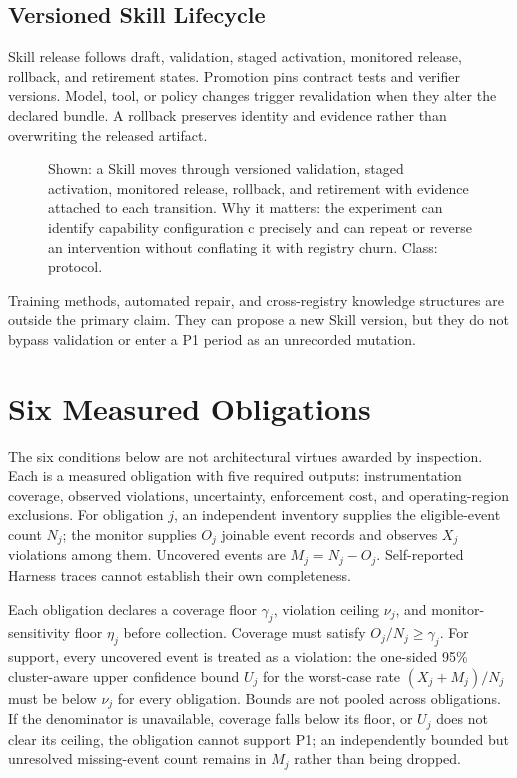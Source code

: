 \subsection{Versioned Skill Lifecycle}

Skill release follows draft, validation, staged activation, monitored release, rollback, and retirement states. Promotion pins contract tests and verifier versions. Model, tool, or policy changes trigger revalidation when they alter the declared bundle. A rollback preserves identity and evidence rather than overwriting the released artifact.

\begin{figure}[t]
\centering
\caption{Shown: a Skill moves through versioned validation, staged activation, monitored release, rollback, and retirement with evidence attached to each transition. Why it matters: the experiment can identify capability configuration c precisely and can repeat or reverse an intervention without conflating it with registry churn. Class: protocol.}
\label{fig:skill-as-code}
\end{figure}

Training methods, automated repair, and cross-registry knowledge structures are outside the primary claim. They can propose a new Skill version, but they do not bypass validation or enter a P1 period as an unrecorded mutation.

\section{Six Measured Obligations}
\label{sec:obligations}

The six conditions below are not architectural virtues awarded by inspection. Each is a measured obligation with five required outputs: instrumentation coverage, observed violations, uncertainty, enforcement cost, and operating-region exclusions. For obligation $j$, an independent inventory supplies the eligible-event count $N_j$; the monitor supplies $O_j$ joinable event records and observes $X_j$ violations among them. Uncovered events are $M_j=N_j-O_j$. Self-reported Harness traces cannot establish their own completeness.

Each obligation declares a coverage floor $\gamma_j$, violation ceiling $\nu_j$, and monitor-sensitivity floor $\eta_j$ before collection. Coverage must satisfy $O_j/N_j\geq\gamma_j$. For support, every uncovered event is treated as a violation: the one-sided 95\% cluster-aware upper confidence bound $U_j$ for the worst-case rate $(X_j+M_j)/N_j$ must be below $\nu_j$ for every obligation. Bounds are not pooled across obligations. If the denominator is unavailable, coverage falls below its floor, or $U_j$ does not clear its ceiling, the obligation cannot support P1; an independently bounded but unresolved missing-event count remains in $M_j$ rather than being dropped.

